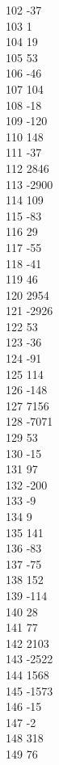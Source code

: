 { 102	-37 \\
 103	1 \\
 104	19 \\
 105	53 \\
 106	-46 \\
 107	104 \\
 108	-18 \\
 109	-120 \\
 110	148 \\
 111	-37 \\
 112	2846 \\
 113	-2900 \\
 114	109 \\
 115	-83 \\
 116	29 \\
 117	-55 \\
 118	-41 \\
 119	46 \\
 120	2954 \\
 121	-2926 \\
 122	53 \\
 123	-36 \\
 124	-91 \\
 125	114 \\
 126	-148 \\
 127	7156 \\
 128	-7071 \\
 129	53 \\
 130	-15 \\
 131	97 \\
 132	-200 \\
 133	-9 \\
 134	9 \\
 135	141 \\
 136	-83 \\
 137	-75 \\
 138	152 \\
 139	-114 \\
 140	28 \\
 141	77 \\
 142	2103 \\
 143	-2522 \\
 144	1568 \\
 145	-1573 \\
 146	-15 \\
 147	-2 \\
 148	318 \\
 149	76 \\
}
